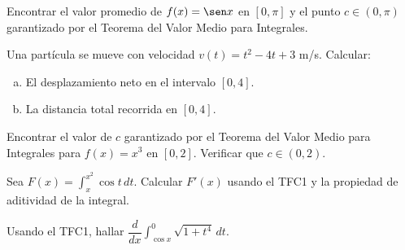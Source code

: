 \begin{prob}
Encontrar el valor promedio de $f(x) = \sen x$ en $[0,\pi]$ y el punto $c \in (0,\pi)$ garantizado por el Teorema del Valor Medio para Integrales.
\end{prob}

\begin{prob}
Una partícula se mueve con velocidad $v(t) = t^2 - 4t + 3$ m/s. Calcular:
\begin{enumerate}[(a)]
    \item El desplazamiento neto en el intervalo $[0,4]$.
    \item La distancia total recorrida en $[0,4]$.
\end{enumerate}
\end{prob}

\begin{prob}
Encontrar el valor de $c$ garantizado por el Teorema del Valor Medio para Integrales para $f(x) = x^3$ en $[0,2]$. Verificar que $c \in (0,2)$.
\end{prob}


\begin{prob}
Sea $F(x) = \displaystyle\int_{x}^{x^2} \cos t\,dt$. Calcular $F'(x)$ usando el TFC1 y la propiedad de aditividad de la integral.
\end{prob}

\begin{prob}
Usando el TFC1, hallar $\dfrac{d}{dx}\displaystyle\int_{\cos x}^{0} \sqrt{1+t^4}\,dt$.
\end{prob}